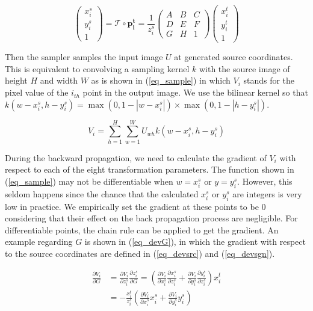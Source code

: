 \documentclass[10pt,twocolumn,letterpaper]{article}
\begin{document}
\begin{equation}\label{eq_projective}
\left(\begin{matrix}
	x^s_i\\y^s_i\\1
	\end{matrix} \right) = 
	\mathcal{T}\circ \mathbf{p^t_i} = 
	\frac{1}{z^s_i}
	\left( \begin{matrix}
	A&B&C\\D&E&F\\G&H&1
	\end{matrix} \right)
	\left(\begin{matrix}
	x^t_i\\y^t_i\\1
	\end{matrix} \right)
\end{equation}
	
Then the sampler samples the input image $U$ at generated source coordinates.
This is equivalent to convolving a sampling kernel $k$ with the source image of height $H$ and width $W$ as is shown in (\ref{eq_sample}) in which $V_i$ stands for the pixel value of the $i_{th}$ point in the output image.
We use the bilinear kernel so that $k(w-x_i^s,h-y_i^s)=\max(0,1-|w-x_i^s|) \times \max(0,1-|h-y_i^s|)$.
 
\begin{equation}\label{eq_sample}
V_i = \sum_{h=1}^{H} \sum_{w=1}^{W} U_{wh} k(w-x_i^s,h-y_i^s) 
\end{equation}

During the backward propagation, we need to calculate the gradient of $V_i$ with respect to each of the eight transformation parameters. The function shown in (\ref{eq_sample}) may not be differentiable when $w=x_i^s$ or $y=y_i^s$. However, this seldom happens since the chance that the calculated $x_i^s$ or $y_i^s$ are integers is very low in practice. We empirically set the gradient at these points to be $0$ considering that their effect on the back propagation process are negligible. For differentiable points, the chain rule can be applied to get the gradient. An example regarding $G$ is shown in (\ref{eq_devG}), in which the gradient with respect to the source coordinates are defined in (\ref{eq_devsrc}) and (\ref{eq_devsgn}). 

	\begin{equation}\label{eq_devG}
	\begin{split}
	\frac{\partial V_i}{\partial G} &= \frac{\partial V_i}{\partial z_i^s} \frac{\partial z_i^s}{\partial G} 
	= \left(\frac{\partial V_i}{\partial x_i^s} \frac{\partial x_i^s}{\partial z_i^s} + \frac{\partial V_i}{\partial y_i^s} \frac{\partial y_i^s}{\partial z_i^s}\right) x_i^t \\
	&=-\frac{x_i^t}{z_i^s}\left(\frac{\partial V_i}{\partial x_i^s} x_i^s + \frac{\partial V_i}{\partial y_i^s} y_i^s\right)
	\end{split}
	\end{equation}
	
\end{document}
